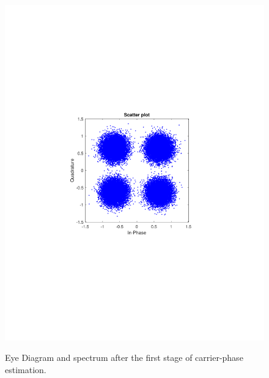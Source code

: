 \begin{refsection}
\begin{figure}[H]
\begin{minipage}{0.30\textwidth}
		\includegraphics[clip, trim=4cm 8cm 4cm 8cm, width=1\textwidth]{./sdf/m_qam_system/figures/expResults/homodyne/5_const_4GBdInSig13dBc_AfPE.pdf}
		\label{fig:4GBdSpecBefFec}
	\end{minipage}
	\caption{Eye Diagram and spectrum after the first stage of carrier-phase estimation.}
\end{figure}


\end{refsection}
